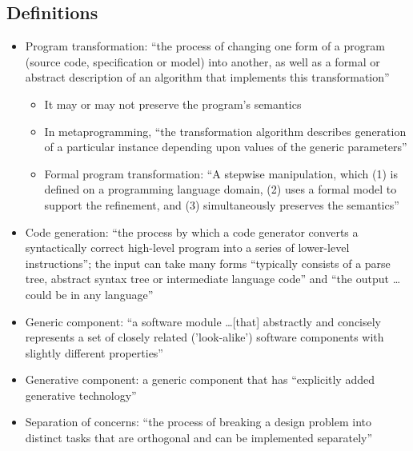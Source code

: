 \subsection{Definitions}
\begin{itemize}
      \item Program transformation: ``the process of changing one form of a
            program (source code, specification or model) into another, as well
            as a formal or abstract description of an algorithm that implements
            this transformation'' \cite[p.~18]{stuikys_taxonomy_2013}
            \begin{itemize}
                  \item It may or may not preserve the program's semantics
                        \cite[p.~18]{stuikys_taxonomy_2013}
                  \item In metaprogramming, ``the transformation algorithm
                        describes generation of a particular instance depending
                        upon values of the generic parameters''
                        \cite[p.~18]{stuikys_taxonomy_2013}
                  \item Formal program transformation: ``A stepwise
                        manipulation, which (1) is defined on a programming
                        language domain, (2) uses a formal model to support the
                        refinement, and (3) simultaneously preserves the
                        semantics'' \cite[p.~18]{stuikys_taxonomy_2013}
            \end{itemize}
      \item Code generation: ``the process by which a code generator converts a
            syntactically correct high-level program into a series of
            lower-level instructions''; the input can take many forms
            ``typically consists of a parse tree, abstract syntax tree or
            intermediate language code'' and ``the output \dots could be in any
            language'' \cite[p.~19]{stuikys_taxonomy_2013}
      \item Generic component: ``a software module \dots [that] abstractly and
            concisely represents a set of closely related ('look-alike')
            software components with slightly different properties''
            \cite[p.~19]{stuikys_taxonomy_2013}
      \item Generative component: a generic component that has ``explicitly
            added generative technology'' \cite[p.~24]{stuikys_taxonomy_2013}
      \item Separation of concerns: ``the process of breaking a design problem
            into distinct tasks that are orthogonal and can be implemented
            separately'' \cite[p.~21]{stuikys_taxonomy_2013}
\end{itemize}

